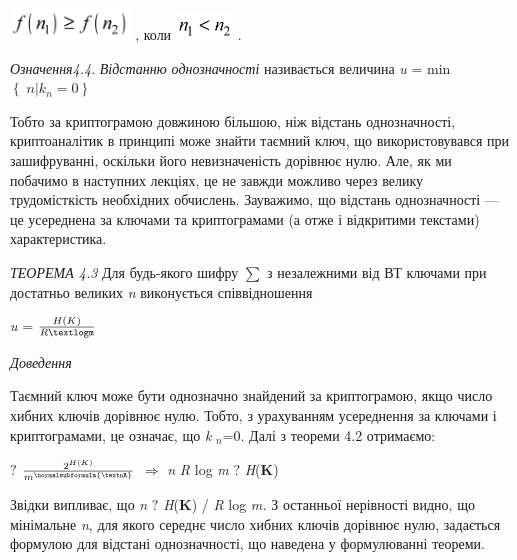 {\centering
 \includegraphics[width=1.2555in,height=0.3339in]{crypt-img/crypt-img43.png} , 
коли  
\includegraphics[width=0.598in,height=0.2984in]{crypt-img/crypt-img44.png} .
\par}

\textit{Означення4.4}. \textit{Відстанню  однозначності} називається
величина\textit{  } \textit{u}\textit{ }= min 
$\left\{ \;n|k_n \right.=0\left.  \right\}$

Тобто  за криптограмою довжиною більшою, ніж відстань однозначності,
криптоаналітик в принципі може знайти таємний ключ, що використовувався при
зашифруванні, оскільки його невизначеність дорівнює нулю. Але, як ми побачимо в
наступних лекціях, це не завжди можливо через  велику трудомісткість необхідних
обчислень. Зауважимо, що відстань однозначності --- це усереднена за ключами та
криптограмами (а отже і відкритими текстами) характеристика.

\textit{ТЕОРЕМА 4.3 } Для будь-якого шифру   $\sum $ з незалежними від ВТ 
ключами  при достатньо великих \textit{n} виконується  співвідношення

{\centering
\textit{u}\textit{ }=   $\frac{H(K)}{R\textlogm}$
\par}

{\itshape
Доведення}

 Таємний ключ може бути однозначно знайдений за  криптограмою, якщо число хибних
ключів дорівнює нулю. Тобто, з урахуванням усереднення за ключами і
криптограмами, це означає, що\textit{  }\textit{k} ${}_n$=0. Далі з
теореми 4.2 отримаємо: 

{   $?$   $\frac{2^{H(K)}}{m^{\normalsubformula{\textnR}}}$  
$\Rightarrow $\textit{  }\textit{n}\textit{ }\textit{R}\textit{ }log
\textit{m}  $?$  \textit{H}(\textbf{K}) 
\par}


\bigskip

Звідки  випливає, що  \textit{n}  $?$  \textit{H}(\textbf{K}) / \textit{R} log
\textit{m}\textit{.}\textit{ }З останньої нерівності видно, що мінімальне
\textit{n}, для якого середнє число хибних ключів дорівнює нулю, задається
формулою для відстані однозначності, що наведена у формулюванні теореми.   $ $
$ $ 

